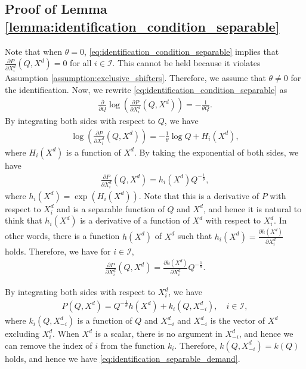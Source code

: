 \documentclass[11pt, a4paper]{article}
\theoremstyle{remark}
\begin{document}
\subsection{Proof of Lemma \ref{lemma:identification_condition_separable}}

Note that when $\theta = 0$, \eqref{eq:identification_condition_separable} implies that $\frac{\partial P}{\partial X^{d}_i}(Q, X^{d}) = 0$ for all $i \in \mathcal{I}$.
This cannot be held because it violates Assumption \ref{assumption:exclusive_shifters}.
Therefore, we assume that $\theta \ne 0$ for the identification.
Now, we rewrite \eqref{eq:identification_condition_separable} as
\begin{align}
    \frac{\partial }{\partial Q}\log \left(\frac{\partial P}{\partial X^{d}_i}(Q, X^{d})\right) = -\frac{1}{\theta Q}.
\end{align}
By integrating both sides with respect to $Q$, we have
\begin{align}
    \log \left(\frac{\partial P}{\partial X^{d}_i}(Q, X^{d})\right) = -\frac{1}{\theta}\log Q + H_i(X^{d}),
\end{align}
where $H_i(X^{d})$ is a function of $X^{d}$.
By taking the exponential of both sides, we have
\begin{align}
    \frac{\partial P}{\partial X^{d}_i}(Q, X^{d}) = h_i(X^{d})Q^{-\frac{1}{\theta}},
\end{align}
where $h_i(X^{d})  = \exp(H_i(X^{d}))$.
Note that this is a derivative of $P$ with respect to $X^{d}_i$ and is a separable function of $Q$ and $X^{d}$, and hence it is natural to think that $h_i(X^{d})$ is a derivative of a function of $X^{d}$ with respect to $X^{d}_i$.
In other words, there is a function $h(X^{d})$ of $X^{d}$ such that $h_i(X^{d}) = \frac{\partial h(X^{d})}{\partial X^{d}_i}$ holds.
Therefore, we have for $i \in \mathcal{I}$,
\begin{align}
    \frac{\partial P}{\partial X^{d}_i}(Q, X^{d}) = \frac{\partial h(X^{d})}{\partial X^{d}_i} Q^{-\frac{1}{\theta}}.
\end{align}

By integrating both sides with respect to $X^{d}_i$, we have
\begin{align}
    P(Q, X^{d}) = Q^{-\frac{1}{\theta}}h(X^{d}) + k_i(Q, X^{d}_{-i}), \quad i \in \mathcal{I}, \label{eq:identification_separable_demand_i}
\end{align}
where $k_i(Q, X^{d}_{-i})$ is a function of $Q$ and $X^{d}_{-i}$ and $X^{d}_{-i}$ is the vector of $X^{d}$ excluding $X^{d}_i$.
When $X^{d}$ is a scalar, there is no argument in $X^{d}_{-i}$, and hence we can remove the index of $i$ from the function $k_i$.
Therefore, $k(Q, X^{d}_{-i}) = k(Q)$ holds, and hence we have \eqref{eq:identification_separable_demand}.
\end{document}
